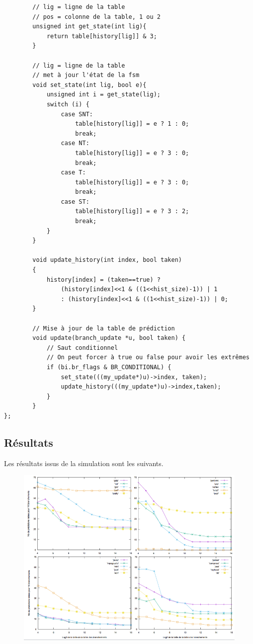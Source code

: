\documentclass[a4paper]{article}
\begin{document}
\begin{verbatim}
        // lig = ligne de la table
        // pos = colonne de la table, 1 ou 2
        unsigned int get_state(int lig){
            return table[history[lig]] & 3;
        }

        // lig = ligne de la table
        // met à jour l'état de la fsm
        void set_state(int lig, bool e){
            unsigned int i = get_state(lig);
            switch (i) {
                case SNT:
                    table[history[lig]] = e ? 1 : 0;
                    break;
                case NT:
                    table[history[lig]] = e ? 3 : 0;
                    break;
                case T:
                    table[history[lig]] = e ? 3 : 0;
                    break;
                case ST:
                    table[history[lig]] = e ? 3 : 2;
                    break;
            }
        }

        void update_history(int index, bool taken)
        {
            history[index] = (taken==true) ?
                (history[index]<<1 & ((1<<hist_size)-1)) | 1
                : (history[index]<<1 & ((1<<hist_size)-1)) | 0;
        }

        // Mise à jour de la table de prédiction
        void update(branch_update *u, bool taken) {
            // Saut conditionnel
            // On peut forcer à true ou false pour avoir les extrêmes
            if (bi.br_flags & BR_CONDITIONAL) {
                set_state(((my_update*)u)->index, taken);
                update_history(((my_update*)u)->index,taken);
            }
        }
};
\end{verbatim}
\normalsize

\subsection{Résultats}

Les résultats issus de la simulation sont les suivants.
\begin{figure}[t]
\includegraphics[width=\linewidth]{2-bit-local.png}
\centering
\end{figure}
\end{document}
